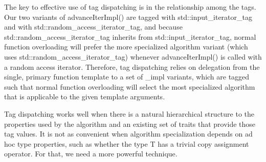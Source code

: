 The key to effective use of tag dispatching is in the relationship among the tags. Our two variants of advanceIterImpl() are tagged with std::input\_iterator\_tag and with std::random\_access\_iterator\_tag, and because std::random\_access\_iterator\_tag inherits from std::input\_iterator\_tag, normal function overloading will prefer the more specialized algorithm variant (which uses std::random\_access\_iterator\_tag) whenever advanceIterImpl() is called with a random access iterator. Therefore, tag dispatching relies on delegation from the single, primary function template to a set of \_impl variants, which are tagged such that normal function overloading will select the most specialized algorithm that is applicable to the given template arguments.

Tag dispatching works well when there is a natural hierarchical structure to the properties used by the algorithm and an existing set of traits that provide those tag values. It is not as convenient when algorithm specialization depends on ad hoc type properties, such as whether the type T has a trivial copy assignment operator. For that, we need a more powerful technique.



































